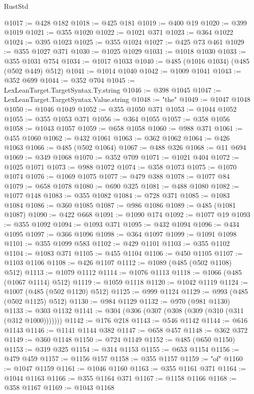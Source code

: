 \begin{lexlean}{RustStd}
\begin{coremodule}
@1017 := @428 @182
@1018 := @425 @181
@1019 := @400 @19
@1020 := @399 @1019
@1021 := @355 @1020
@1022 := @1021 @371
@1023 := @364 @1022
@1024 := @395 @1023
@1025 := @355 @1024
@1027 := @425 @73 @461
@1029 := @355 @1027 @371
@1030 := @1025 @1029
@1031 := @1018 @1030
@1033 := @355 @1031 @754
@1034 := @1017 @1033
@1040 := @485 (@1016 @1034) (@485 (@502 @449) @512)
@1041 := @1014 @1040
@1042 := @1009 @1041
@1043 := @352 @699
@1044 := @352 @704
@1045 := LexLeanTarget.TargetSyntax.Ty.string
@1046 := @398 @1045
@1047 := LexLeanTarget.TargetSyntax.Value.string
@1048 := "the"
@1049 := @1047 @1048
@1050 := @1046 @1049
@1052 := @355 @1050 @371
@1053 := @1044 @1052
@1055 := @355 @1053 @371
@1056 := @364 @1055
@1057 := @358 @1056
@1058 := @1043 @1057
@1059 := @658 @1058
@1060 := @988 @371
@1061 := @455 @1060
@1062 := @432 @1061
@1063 := @362 @1062
@1064 := @426 @1063
@1066 := @485 (@502 @1064)
@1067 := @488 @326
@1068 := @11 @694
@1069 := @349 @1068
@1070 := @352 @709
@1071 := @1021 @404
@1072 := @1025 @1071
@1073 := @988 @1072
@1074 := @358 @1073
@1075 := @1070 @1074
@1076 := @1069 @1075
@1077 := @479 @388
@1078 := @1077 @84
@1079 := @658 @1078
@1080 := @690 @325
@1081 := @488 @1080
@1082 := @1077 @148
@1083 := @355 @1082
@1084 := @728 @371
@1085 := @1083 @1084
@1086 := @360 @1085
@1087 := @986 @1086
@1089 := @485 (@1081 @1087)
@1090 := @422 @668
@1091 := @1090 @174
@1092 := @1077 @19
@1093 := @355 @1092
@1094 := @1093 @371
@1095 := @432 @1094
@1096 := @434 @1095
@1097 := @366 @1096
@1098 := @364 @1097
@1099 := @1091 @1098
@1101 := @355 @1099 @583
@1102 := @429 @1101
@1103 := @355 @1102
@1104 := @1083 @371
@1105 := @455 @1104
@1106 := @450 @1105
@1107 := @1103 @1106
@1108 := @426 @1107
@1112 := @1089 (@485 (@502 @1108) @512)
@1113 := @1079 @1112
@1114 := @1076 @1113
@1118 := @1066 (@485 (@1067 @1114) @512)
@1119 := @1059 @1118
@1120 := @1042 @1119
@1124 := @1007 (@485 (@502 @1120) @512)
@1125 := @999 @1124
@1129 := @993 (@485 (@502 @1125) @512)
@1130 := @984 @1129
@1132 := @970 (@981 @1130)
@1133 := @303 @1132
@1141 := @304 (@306 (@307 (@308 (@309 (@310 (@311 (@312 @1000)))))))
@1142 := @176 @218
@1143 := @546 @1142
@1144 := @616 @1143
@1146 := @1141 @1144 @382
@1147 := @658 @457
@1148 := @362 @372
@1149 := @360 @1148
@1150 := @724 @1149
@1152 := @485 (@650 @1150)
@1153 := @319 @325
@1154 := @314 @1153
@1155 := @653 @1154
@1156 := @479 @459
@1157 := @1156 @157
@1158 := @355 @1157
@1159 := "of"
@1160 := @1047 @1159
@1161 := @1046 @1160
@1163 := @355 @1161 @371
@1164 := @1044 @1163
@1166 := @355 @1164 @371
@1167 := @1158 @1166
@1168 := @358 @1167
@1169 := @1043 @1168

\end{coremodule}
\end{lexlean}
